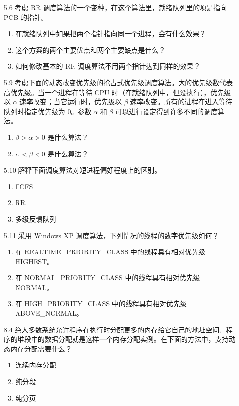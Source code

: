 \documentclass[UTF8]{ctexart}
\begin{document}
\begin{enumerate}
\begin{enumerate}
		\item[5.6] 考虑 RR 调度算法的一个变种，在这个算法里，就绪队列里的项是指向 PCB 的指针。
		\begin{enumerate}
			\item 在就绪队列中如果把两个指针指向同一个进程，会有什么效果？
			\item 这个方案的两个主要优点和两个主要缺点是什么？
			\item 如何修改基本的 RR 调度算法不用两个指针达到同样的效果？
		\end{enumerate}
		
		\item[5.9] 考虑下面的动态改变优先级的抢占式优先级调度算法。大的优先级数代表高优先级。当一个进程在等待 CPU 时（在就绪队列中，但没执行），优先级以 $\alpha$ 速率改变；当它运行时，优先级以 $\beta$ 速率改变。所有的进程在进入等待队列时指定优先级为 0。参数 $\alpha$ 和 $\beta$ 可以进行设定得到许多不同的调度算法。
		\begin{enumerate}
			\item $\beta > \alpha > 0$ 是什么算法？
			\item $\alpha < \beta < 0$ 是什么算法？
		\end{enumerate}
		
		\item[5.10] 解释下面调度算法对短进程偏好程度上的区别。
		\begin{enumerate}
			\item FCFS
			\item RR
			\item 多级反馈队列
		\end{enumerate}
		
		\item[5.11] 采用 Windows XP 调度算法，下列情况的线程的数字优先级如何？
		\begin{enumerate}
			\item 在 REALTIME\_PRIORITY\_CLASS 中的线程具有相对优先级 HIGHEST。
			\item 在 NORMAL\_PRIORITY\_CLASS 中的线程具有相对优先级 NORMAL。
			\item 在 HIGH\_PRIORITY\_CLASS 中的线程具有相对优先级 ABOVE\_NORMAL。
		\end{enumerate}
	\end{enumerate}
	
	\begin{enumerate}
		\item[8.4] 绝大多数系统允许程序在执行时分配更多的内存给它自己的地址空间。程序的堆段中的数据分配就是这样一个内存分配实例。在下面的方法中，支持动态内存分配需要什么？
		\begin{enumerate}
			\item 连续内存分配
			\item 纯分段
			\item 纯分页
		\end{enumerate}
		

\end{enumerate}
\end{enumerate}
\end{document}
